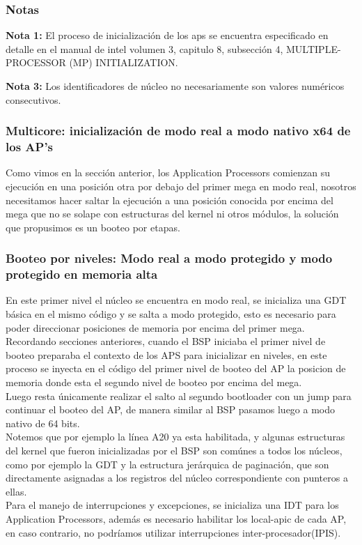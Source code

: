 \documentclass{beamer}
\begin{document}
	\begin{frame}
		\frametitle{Notas}
		\textbf{Nota 1: } El proceso de inicialización de los aps se encuentra especificado en detalle en el manual de intel volumen 3, capitulo 8, subsección 4, MULTIPLE-PROCESSOR (MP) INITIALIZATION.

		\textbf{Nota 3: } Los identificadores de núcleo no necesariamente son valores numéricos consecutivos.
	\end{frame}

	\begin{frame}
		\frametitle{Multicore: inicialización de modo real a modo nativo x64 de los AP's}
	    Como vimos en la sección anterior, los Application Processors comienzan su ejecución en una posición otra por debajo del primer mega en modo real, nosotros necesitamos hacer saltar la ejecución a una posición conocida por encima del mega que no se solape con estructuras del kernel ni otros módulos, la solución que propusimos es un booteo por etapas.
	    
	    \subsubsection{Booteo por niveles: Modo real a modo protegido y modo protegido en memoria alta}
	    En este primer nivel el núcleo se encuentra en modo real, se inicializa una GDT básica en el mismo código y se salta a modo protegido, esto es necesario para poder direccionar posiciones de memoria por encima del primer mega.\\

	    Recordando secciones anteriores, cuando el BSP iniciaba el primer nivel de booteo preparaba el contexto de los APS para inicializar en niveles, en este proceso se inyecta en el código del primer nivel de booteo del AP la posicion de memoria donde esta el segundo nivel de booteo por encima del mega.\\

	    Luego resta únicamente realizar el salto al segundo bootloader con un jump para continuar el booteo del AP, de manera similar al BSP pasamos luego a modo nativo de 64 bits.\\
	    Notemos que por ejemplo la línea A20 ya esta habilitada, y algunas estructuras del kernel que fueron inicializadas por el BSP son comúnes a todos los núcleos, como por ejemplo la GDT y la estructura jerárquica de paginación,
	    que son directamente asignadas a los registros del núcleo correspondiente con punteros a ellas.
	    \\
	    Para el manejo de interrupciones y excepciones, se inicializa una IDT para los Application Processors, además es necesario habilitar los local-apic de cada AP, en caso contrario, no podríamos utilizar interrupciones inter-procesador(IPIS).
	    \\


\end{frame}
\end{document}
